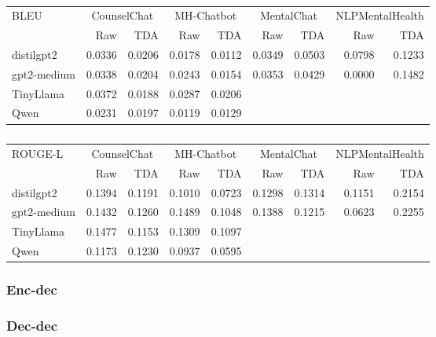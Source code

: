 \documentclass{article}
\begin{document}
\begin{table}[h!]
\begin{adjustbox}{width=\columnwidth,center}
\begin{tabular}[t]{lrrrrrrrr}
\toprule
\multirow{2}{*}{BLEU} & \multicolumn{2}{c}{CounselChat} & \multicolumn{2}{c}{MH-Chatbot}  & \multicolumn{2}{c}{MentalChat} & \multicolumn{2}{c}{NLPMentalHealth} \\
\cmidrule(l{3pt}r{3pt}){2-3} \cmidrule(l{3pt}r{3pt}){4-5} \cmidrule(l{3pt}r{3pt}){6-7} \cmidrule(l{3pt}r{3pt}){8-9}
 & Raw & TDA & Raw & TDA & Raw & TDA & Raw & TDA \\
\midrule
distilgpt2   & 0.0336 & 0.0206 & 0.0178 & 0.0112 & 0.0349 & 0.0503 & 0.0798 & 0.1233 \\
gpt2-medium  & 0.0338 & 0.0204 & 0.0243 & 0.0154 & 0.0353 & 0.0429 & 0.0000 & 0.1482 \\
TinyLlama  & 0.0372 & 0.0188 & 0.0287 & 0.0206 &  &  &  &  \\
Qwen  & 0.0231 & 0.0197 & 0.0119 & 0.0129 &  &  &  &  \\ 
\bottomrule
\end{tabular}
\end{adjustbox}
\caption{}
\label{tbl:dec-dec_bleu}
\end{table}

\begin{table}[h!]
\begin{adjustbox}{width=\columnwidth,center}
\begin{tabular}[t]{lrrrrrrrr}
\toprule
\multirow{2}{*}{ROUGE-L} & \multicolumn{2}{c}{CounselChat} & \multicolumn{2}{c}{MH-Chatbot}  & \multicolumn{2}{c}{MentalChat} & \multicolumn{2}{c}{NLPMentalHealth} \\
\cmidrule(l{3pt}r{3pt}){2-3} \cmidrule(l{3pt}r{3pt}){4-5} \cmidrule(l{3pt}r{3pt}){6-7} \cmidrule(l{3pt}r{3pt}){8-9}
 & Raw & TDA & Raw & TDA & Raw & TDA & Raw & TDA \\
\midrule
distilgpt2   & 0.1394 & 0.1191 & 0.1010 & 0.0723 & 0.1298 & 0.1314 & 0.1151 & 0.2154 \\
gpt2-medium  & 0.1432 & 0.1260 & 0.1489 & 0.1048 & 0.1388 & 0.1215 & 0.0623 & 0.2255 \\
TinyLlama  & 0.1477 & 0.1153 & 0.1309 & 0.1097 &  &  &  &  \\
Qwen  & 0.1173 & 0.1230 & 0.0937 & 0.0595 &  &  &  &  \\ 
\bottomrule
\end{tabular}
\end{adjustbox}
\caption{}
\label{tbl:dec-dec_rougel}
\end{table}


\subsubsection{Enc-dec}

\subsubsection{Dec-dec}




\end{document}
